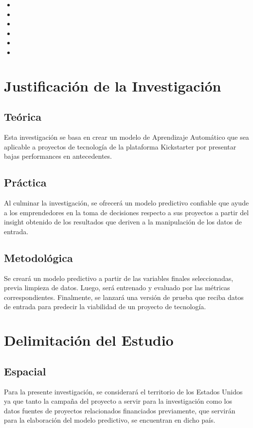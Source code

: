 \begin{itemize}
	\item {\Objone}
	\item {\Objtwo}
	\item {\Objthree}
	\item {\Objfour}
	\item {\Objfive}
	\item {\Objsix}
\end{itemize}

\section{Justificación de la Investigación}

\subsection{Teórica}
Esta investigación se basa en crear un modelo de Aprendizaje Automático que sea aplicable a proyectos de tecnología de la plataforma Kickstarter por presentar bajas performances en antecedentes.

\subsection{Práctica}
Al culminar la investigación, se ofrecerá un modelo predictivo confiable que ayude a los emprendedores en la toma de decisiones respecto a sus proyectos a partir del insight obtenido de los resultados que deriven a la manipulación de los datos de entrada.

\subsection{Metodológica}
Se creará un modelo predictivo a partir de las variables finales seleccionadas, previa limpieza de datos. Luego, será entrenado y evaluado por las métricas correspondientes. Finalmente, se lanzará una versión de prueba que reciba datos de entrada para predecir la viabilidad de un proyecto de tecnología.

\section{Delimitación del Estudio}

\subsection{Espacial}
Para la presente investigación, se considerará el territorio de los Estados Unidos ya que tanto la campaña del proyecto a servir para la investigación como los datos fuentes de proyectos relacionados financiados previamente, que servirán para la elaboración del modelo predictivo, se encuentran en dicho país.

